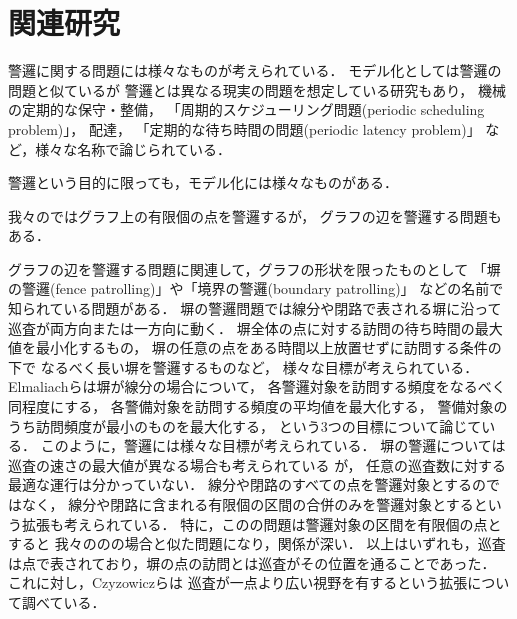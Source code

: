 \section{関連研究}
\label{section: relatedWorks}



警邏に関する問題には様々なものが考えられている．
モデル化としては警邏の問題と似ているが
警邏とは異なる現実の問題を想定している研究もあり，
機械の定期的な保守・整備\cite{anily1998scheduling, bar2002minimizing}，
「周期的スケジューリング問題(periodic scheduling problem)」\cite{sgall2009periodic}，
配達\cite{campbell2005vehicle}，
「定期的な待ち時間の問題(periodic latency problem)」\cite{coene2011charlemagne}
など，様々な名称で論じられている．


警邏という目的に限っても，モデル化には様々なものがある．


我々の{\patProb}ではグラフ上の有限個の点を警邏するが，
グラフの辺を警邏する問題もある\cite{yanovski2003distributed}．

グラフの辺を警邏する問題に関連して，グラフの形状を限ったものとして
「塀の警邏(fence patrolling)」や「境界の警邏(boundary patrolling)」
などの名前で知られている問題がある\cite{
    czyzowicz2011boundary,
    chen2013fence,
    elmaliach2008realistic,
    collins2013optimal}．
塀の警邏問題では線分や閉路で表される塀に沿って巡査が両方向または一方向に動く．
塀全体の点に対する訪問の待ち時間の最大値を最小化するもの\cite{chen2013fence}，
塀の任意の点をある時間以上放置せずに訪問する条件の下で
なるべく長い塀を警邏するもの\cite{czyzowicz2011boundary}など，
様々な目標が考えられている．
%
Elmaliachら\cite{elmaliach2008realistic}は塀が線分の場合について，
各警邏対象を訪問する頻度をなるべく同程度にする，
各警備対象を訪問する頻度の平均値を最大化する，
警備対象のうち訪問頻度が最小のものを最大化する，
という3つの目標について論じている．
%
このように，警邏には様々な目標が考えられている．
%
塀の警邏については巡査の速さの最大値が異なる場合も考えられている
\cite{czyzowicz2011boundary, czyzowicz2016fence, kawamura2015fence}が，
任意の巡査数に対する最適な運行は分かっていない．
%
線分や閉路のすべての点を警邏対象とするのではなく，
線分や閉路に含まれる有限個の区間の合併のみを警邏対象とするという拡張も考えられている\cite{collins2013optimal}．
特に，この\cite{collins2013optimal}の問題は警邏対象の区間を有限個の点とすると
我々の{\patProb}の{\graphLine}の場合と似た問題になり，関係が深い．
%
以上はいずれも，巡査は点で表されており，塀の点の訪問とは巡査がその位置を通ることであった．
これに対し，Czyzowiczら\cite{czyzowicz2014patrolling}は
巡査が一点より広い視野を有するという拡張について調べている．



